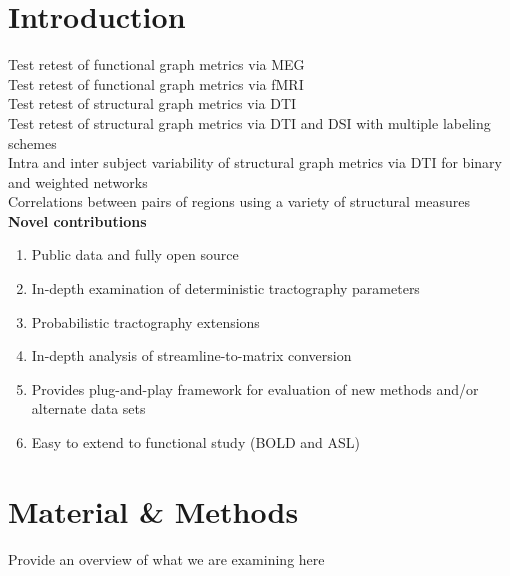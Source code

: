 \documentclass{frontiersSCNS} %
\begin{document}
\section{Introduction}

Test retest of functional graph metrics via MEG \citep{Deuker2009}\\
Test retest of functional graph metrics via fMRI \citep{Telesford2010}\\
Test retest of structural graph metrics via DTI \citep{Owen2013BC}\\ 
Test retest of structural graph metrics via DTI and DSI with multiple labeling schemes \citep{Bassett2011N}\\
Intra and inter subject variability of structural graph metrics via DTI for binary and weighted networks \citep{Cheng2012N}\\
Correlations between pairs of regions using a variety of structural measures \citep{Irimia2012N}\\

\textbf{Novel contributions}
\begin{enumerate}
\item Public data and fully open source
\item In-depth examination of deterministic tractography parameters
\item Probabilistic tractography extensions
\item In-depth analysis of streamline-to-matrix conversion
\item Provides plug-and-play framework for evaluation of new methods and/or alternate data sets
\item Easy to extend to functional study (BOLD and ASL) 
\end{enumerate}


\section{Material \& Methods}
Provide an overview of what we are examining here
\end{document}
